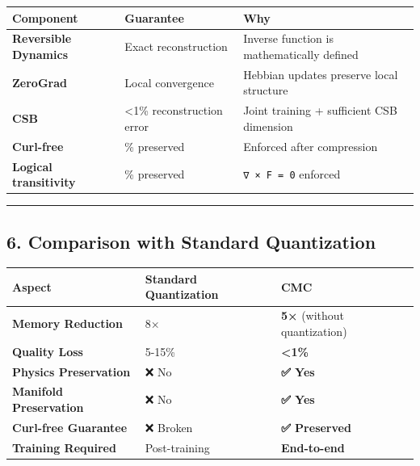 \documentclass[
  11pt,
  a4paper,
]{article}
\begin{document}
\begin{longtable}[]{@{}
  >{\raggedright\arraybackslash}p{}
  >{\raggedright\arraybackslash}p{}
  >{\raggedright\arraybackslash}p{}@{}}
\toprule\noalign{}
\begin{minipage}[b]{\linewidth}\raggedright
Component
\end{minipage} & \begin{minipage}[b]{\linewidth}\raggedright
Guarantee
\end{minipage} & \begin{minipage}[b]{\linewidth}\raggedright
Why
\end{minipage} \\
\midrule\noalign{}
\endhead
\bottomrule\noalign{}
\endlastfoot
\textbf{Reversible Dynamics} & Exact reconstruction & Inverse function
is mathematically defined \\
\textbf{ZeroGrad} & Local convergence & Hebbian updates preserve local
structure \\
\textbf{CSB} & \textless1\% reconstruction error & Joint training +
sufficient CSB dimension \\
\textbf{Curl-free} & 100\% preserved & Enforced after compression \\
\textbf{Logical transitivity} & 100\% preserved & \texttt{∇\ ×\ F\ =\ 0}
enforced \\
\end{longtable}

\begin{center}\rule{0.5\linewidth}{0.5pt}\end{center}

\subsection{6. Comparison with Standard
Quantization}\label{comparison-with-standard-quantization}

\begin{longtable}[]{@{}lll@{}}
\toprule\noalign{}
Aspect & Standard Quantization & CMC \\
\midrule\noalign{}
\endhead
\bottomrule\noalign{}
\endlastfoot
\textbf{Memory Reduction} & 8× & \textbf{5×} (without quantization) \\
\textbf{Quality Loss} & 5-15\% & \textbf{\textless1\%} \\
\textbf{Physics Preservation} & ❌ No & \textbf{✅ Yes} \\
\textbf{Manifold Preservation} & ❌ No & \textbf{✅ Yes} \\
\textbf{Curl-free Guarantee} & ❌ Broken & \textbf{✅ Preserved} \\
\textbf{Training Required} & Post-training & \textbf{End-to-end} \\
\end{longtable}
\end{document}
